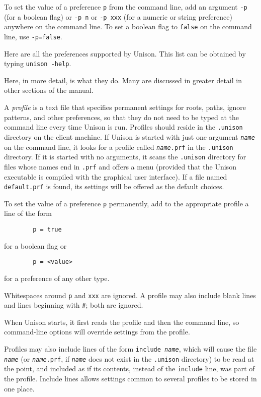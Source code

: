 \documentclass{article}
\newcommand{\ARG}[1]{\texttt{\textit{#1}}}
\begin{document}
To set the value of a preference {\tt p} from the command line, add an
argument {\tt -p} (for a boolean flag) or {\tt -p n} or {\tt -p xxx} (for
a numeric or string preference) anywhere on the command line.  To set a
boolean flag to \verb|false| on the command line, use {\tt -p=false}.

Here are all the preferences supported by Unison.  This list can be
  obtained by typing {\tt unison -help}.
\begin{quote}

\end{quote}
Here, in more detail, is what they do.  Many are discussed in greater detail
in other sections of the manual.
%




A {\em profile} is a text file that specifies permanent settings for
roots, paths, ignore patterns, and other preferences, so that they do
not need to be typed at the command line every time Unison is run.
Profiles should reside in the \verb|.unison| directory on the client
machine.  If Unison is started with just one argument \ARG{name} on
the command line, it looks for a profile called \texttt{\ARG{name}.prf} in
the \verb|.unison| directory.  If it is started with no arguments, it
scans the \verb|.unison| directory for files whose names end in
\verb|.prf| and offers a menu (provided that the Unison executable is compiled with the graphical user interface).  If a file named \verb|default.prf| is
found, its settings will be offered as the default choices.

To set the value of a preference {\tt p} permanently, add to the
appropriate profile a line of the form
\begin{verbatim}
        p = true
\end{verbatim}
for a boolean flag or
\begin{verbatim}
        p = <value>
\end{verbatim}
for a preference of any other type.

Whitespaces around {\tt p} and {\tt xxx} are ignored.
A profile may also include blank lines and lines beginning
with {\tt \#}; both are ignored.

When Unison starts, it first reads the profile and then the command
line, so command-line options will override settings from the
profile.

Profiles may also include lines of the form \texttt{include
  \ARG{name}}, which will cause the file \ARG{name} (or
\texttt{\ARG{name}.prf}, if \ARG{name} does not exist in the
\verb+.unison+ directory) to be read at the point, and included as if
its contents, instead of the \texttt{include} line, was part of the
profile.  Include lines allows settings common to several profiles to
be stored in one place.
\end{document}
